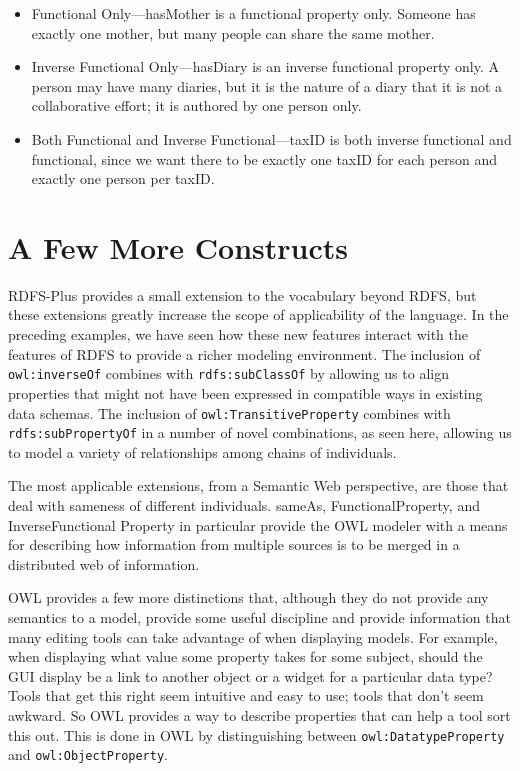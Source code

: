 \begin{itemize}
\item Functional Only---hasMother is a functional property only. Someone has
exactly one mother, but many people can share the same mother.

\item Inverse Functional Only---hasDiary is an inverse functional property
only. A person may have many diaries, but it is the nature of a diary
that it is not a collaborative effort; it is authored by one person
only.

\item Both Functional and Inverse Functional---taxID is both inverse
functional and functional, since we want there to be exactly one taxID
for each person and exactly one person per taxID.
\end{itemize}



\section{A Few More Constructs}

RDFS-Plus provides a small extension to the vocabulary beyond RDFS, but
these extensions greatly increase the scope of applicability of the
language. In the preceding examples, we have seen how these new features
interact with the features of RDFS to provide a richer modeling
environment. The inclusion of \texttt{owl:inverseOf} combines with
\texttt{rdfs:subClassOf} by allowing us to align
properties that might not have been expressed in compatible ways in
existing data schemas. The inclusion of \texttt{owl:TransitiveProperty} combines
with \texttt{rdfs:subPropertyOf} in a number of novel combinations, as seen here,
allowing us to model a variety of relationships among chains of
individuals.

The most applicable extensions, from a Semantic Web perspective, are
those that deal with sameness of different individuals. sameAs,
FunctionalProperty, and InverseFunctional Property in particular provide
the OWL modeler with a means for describing how information from
multiple sources is to be merged in a distributed web of information.

OWL provides a few more distinctions that, although they do not provide
any semantics to a model, provide some useful discipline and provide
information that many editing tools can take advantage of when
displaying models. For example, when displaying what value some property
takes for some subject, should the GUI display be a link to another
object or a widget for a particular data type? Tools that get this right
seem intuitive and easy to use; tools that don't seem awkward. So OWL
provides a way to describe properties that can help a tool sort this
out. This is done in OWL by distinguishing between \texttt{owl:DatatypeProperty}
and \texttt{owl:ObjectProperty}.

